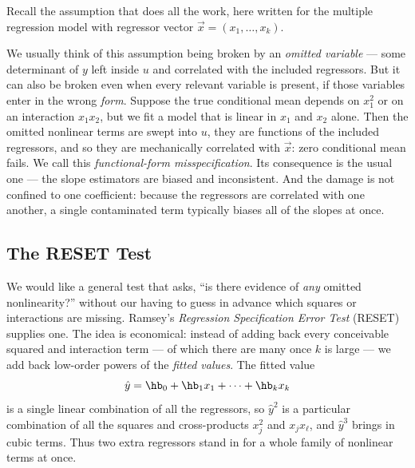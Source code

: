 Recall the assumption that does all the work, here written for the multiple regression model with regressor vector $\vec x=(x_1,\dots,x_k)$.


We usually think of this assumption being broken by an \emph{omitted variable} --- some determinant of $y$ left inside $u$ and correlated with the included regressors. But it can also be broken even when every relevant variable is present, if those variables enter in the wrong \emph{form}. Suppose the true conditional mean depends on $x_1^2$ or on an interaction $x_1 x_2$, but we fit a model that is linear in $x_1$ and $x_2$ alone. Then the omitted nonlinear terms are swept into $u$, they are functions of the included regressors, and so they are mechanically correlated with $\vec x$: zero conditional mean fails. We call this \emph{functional-form misspecification}. Its consequence is the usual one --- the slope estimators are biased and inconsistent. And the damage is not confined to one coefficient: because the regressors are correlated with one another, a single contaminated term typically biases all of the slopes at once.


\subsection{The RESET Test}

We would like a general test that asks, ``is there evidence of \emph{any} omitted nonlinearity?'' without our having to guess in advance which squares or interactions are missing. Ramsey's \emph{Regression Specification Error Test} (RESET) supplies one. The idea is economical: instead of adding back every conceivable squared and interaction term --- of which there are many once $k$ is large --- we add back low-order powers of the \emph{fitted values}. The fitted value
\[
\hat y = \hb_0 + \hb_1 x_1 + \cdots + \hb_k x_k
\]
is a single linear combination of all the regressors, so $\hat y^2$ is a particular combination of all the squares and cross-products $x_j^2$ and $x_j x_\ell$, and $\hat y^3$ brings in cubic terms. Thus two extra regressors stand in for a whole family of nonlinear terms at once.

